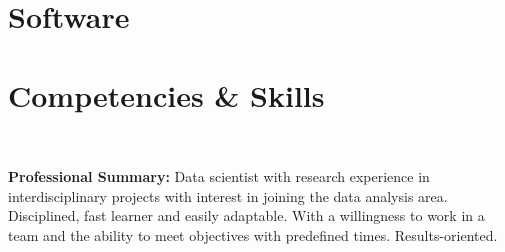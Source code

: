 \documentclass[]{friggeri-cv}
\begin{document}
\begin{aside}
  \section{Software}
\vspace{0.5cm}
  \section{Competencies \& Skills}
    ~
\end{aside}
\textbf{Professional Summary:}
Data scientist with research experience in interdisciplinary projects with interest in joining the data analysis area. Disciplined, fast learner and easily adaptable. With a willingness to work in a team and the ability to meet objectives with predefined times. Results-oriented.
\vspace{-0.4cm}
\end{document}

